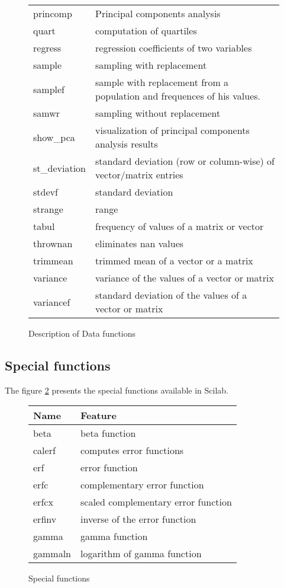 \begin{figure}[htbp]
\begin{tabular}{|l|l|}
princomp & Principal components analysis \\
quart & computation of quartiles \\
regress & regression coefficients of two variables \\
sample & sampling with replacement \\
samplef & sample with replacement from a population and frequences of his values. \\
samwr & sampling without replacement \\
show\_pca & visualization of principal components analysis results \\
st\_deviation & standard deviation (row or column-wise) of vector/matrix entries  \\
stdevf & standard deviation \\
strange & range \\
tabul & frequency of values of a matrix or vector \\
thrownan & eliminates nan values \\
trimmean & trimmed mean of a vector or a matrix \\
variance & variance of the values of a vector or matrix \\
variancef & standard deviation of the values of a vector or matrix \\
\hline
\end{tabular}
\caption{Description of Data functions}
\label{inscilab-descriptionfunctions}
\end{figure}

\subsection{Special functions}

The figure \ref{inscilab-specialfunctions} presents the special functions 
available in Scilab.

\begin{figure}[htbp]
\begin{tabular}{|l|l|}
\hline
Name & Feature\\
\hline
beta & beta function \\
calerf & computes error functions \\
erf & error function \\
erfc & complementary error function \\
erfcx & scaled complementary error function \\
erfinv & inverse of the error function \\
gamma & gamma function \\
gammaln & logarithm of gamma function \\
\hline
\end{tabular}
\caption{Special functions}
\label{inscilab-specialfunctions}
\end{figure}


